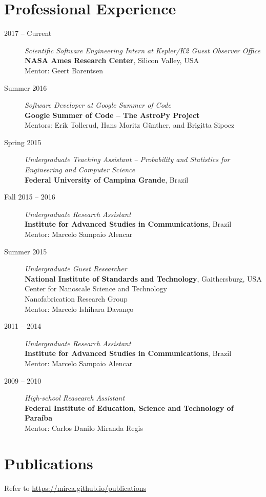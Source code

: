 \documentclass[10pt]{article}
\begin{document}
\begin{titlepage}
\section*{Professional Experience}
\begin{description}
\item[2017 -- Current] \emph{Scientific Software Engineering Intern at Kepler/K2 Guest Observer Office}
\\\textbf{NASA Ames Research Center}, Silicon Valley, USA
\\Mentor: Geert Barentsen
\item[Summer 2016] \emph{Software Developer at Google Summer of Code}
\\\textbf{Google Summer of Code -- The AstroPy Project}
\\Mentors: Erik Tollerud, Hans Moritz G\"unther, and Brigitta Sipocz
\item[Spring 2015] \emph{Undergraduate Teaching Assistant -- Probability and Statistics for Engineering and Computer Science}
\\\textbf{Federal University of Campina Grande}, Brazil
\item[Fall 2015 -- 2016] \emph{Undergraduate Research Assistant}
\\\textbf{Institute for Advanced Studies in Communications}, Brazil
\\Mentor: Marcelo Sampaio Alencar
\item[Summer 2015] \emph{Undergraduate Guest Researcher}
\\\textbf{National Institute of Standards and Technology}, Gaithersburg, USA
\\Center for Nanoscale Science and Technology
\\Nanofabrication Research Group
\\Mentor: Marcelo Ishihara Davan\c co
\item[2011 -- 2014] \emph{Undergraduate Research Assistant}
\\\textbf{Institute for Advanced Studies in Communications}, Brazil
\\Mentor: Marcelo Sampaio Alencar
\item[2009 -- 2010] \emph{High-school Reasearch Assistant}
\\\textbf{Federal Institute of Education, Science and Technology of Para\'iba}
\\Mentor: Carlos Danilo Miranda Regis
\end{description}

\section*{Publications}
Refer to \url{https://mirca.github.io/publications}


\end{titlepage}
\end{document}
